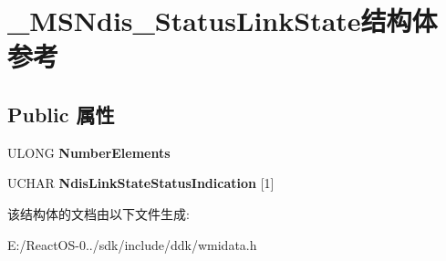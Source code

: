 \hypertarget{struct___m_s_ndis___status_link_state}{}\section{\+\_\+\+M\+S\+Ndis\+\_\+\+Status\+Link\+State结构体 参考}
\label{struct___m_s_ndis___status_link_state}
\subsection*{Public 属性}
\begin{DoxyCompactItemize}
\item 
\mbox{\label{struct___m_s_ndis___status_link_state_a6d2f47d8d1ed5e22e8118d28d01f74db}} 
U\+L\+O\+NG {\bfseries Number\+Elements}
\item 
\mbox{\label{struct___m_s_ndis___status_link_state_aa115db2a230475d92659283d759c6f4a}} 
U\+C\+H\+AR {\bfseries Ndis\+Link\+State\+Status\+Indication} \mbox{[}1\mbox{]}
\end{DoxyCompactItemize}


该结构体的文档由以下文件生成\+:\begin{DoxyCompactItemize}
\item 
E\+:/\+React\+O\+S-\/0../sdk/include/ddk/wmidata.\+h\end{DoxyCompactItemize}
